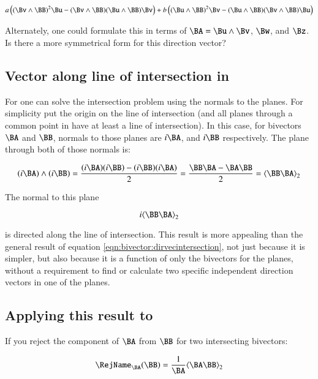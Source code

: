\begin{equation}
\label{eqn:bivector:dirvecintersection}
a\left( (\Bv \wedge \BB)^2 \Bu
- (\Bv \wedge \BB)(\Bu \wedge \BB)\Bv \right)
+ b\left((\Bu \wedge \BB)^2 \Bv 
- (\Bu \wedge \BB)(\Bv \wedge \BB)\Bu\right)
\end{equation}

Alternately, one could formulate this in terms of $\BA = \Bu \wedge \Bv$, $\Bw$, and $\Bz$.  Is there a more symmetrical form for this direction vector?

\subsection{Vector along line of intersection in }

For  one can solve the intersection problem using the normals to the planes.  For simplicity put the origin on the line of intersection (and all planes through a common point in  have at least a line of intersection).  In this case, for bivectors $\BA$ and $\BB$, normals to those planes are $i\BA$, and $i\BB$ respectively.  The plane through both of those normals is:

\begin{align*}
(i\BA) \wedge (i\BB)
= \frac{(i\BA)(i\BB) - (i\BB)(i\BA)}{2} 
= \frac{\BB\BA - \BA\BB}{2} 
= \gpgradetwo{\BB\BA}
\end{align*}

The normal to this plane

\begin{equation}
\label{eqn:bivector:r3planeintersect}
i\gpgradetwo{\BB\BA}
\end{equation}

is directed along the line of intersection.  This result is more appealing than the general  result of equation \ref{eqn:bivector:dirvecintersection}, not just because it is simpler, but also because it is a function of only the bivectors for the planes, without a requirement to find or calculate two specific independent direction vectors in one of the planes.

\subsection{Applying this result to  }

If you reject the component of $\BA$ from $\BB$ for two intersecting bivectors:

\begin{align*}
\RejName_{\BA}(\BB) = \frac{1}{\BA}\gpgradetwo{\BA\BB}
\end{align*}

